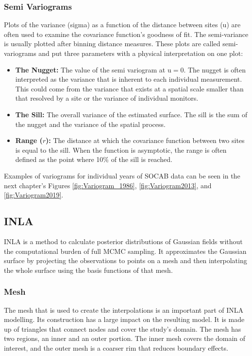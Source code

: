 \subsubsection*{Semi Variograms}
\label{subsubsec:semivariograms}
Plots of the variance (\gls{sigma}) as a function of the distance between sites (\gls{u}) are often used to examine the covariance function's goodness of fit. The semi-variance is usually plotted after binning distance measures. These plots are called semi-variograms and put three parameters with a physical interpretation on one plot:

\begin{itemize}
	\item \textbf{The Nugget:} The value of the semi variogram at \gls{u}$=0$.  The nugget is often interpreted as the variance that is inherent to each individual measurement.  This could come from the variance that exists at a spatial scale smaller than that resolved by a site or the variance of individual monitors.
	\item  \textbf{The Sill:} The overall variance of the estimated surface.  The sill is the sum of the nugget and the variance of the spatial process.
	\item \textbf{Range ($r$):} The distance at which the covariance function between two sites is equal to the sill.  When the function is asymptotic, the range is often defined as the point where 10\% of the sill is reached.  
\end{itemize}

Examples of variograms for individual years of \ac{SOCAB} data can be seen in the next chapter's Figures \ref{fig:Variogram_1986}, \ref{fig:Variogram2013}, and \ref{fig:Variogram2019}.


\subsection{INLA}
\label{subsec:inla}
\ac{INLA} is a method to calculate posterior distributions of Gaussian fields without the computational burden of full \ac{MCMC} sampling. It approximates the Gaussian surface by projecting the observations to points on a mesh and then interpolating the whole surface using the basis functions of that mesh.

\subsubsection*{Mesh} \label{subsec:IntroMesh}
The mesh that is used to create the interpolations is an important part of \ac{INLA} modelling.  Its construction has a large impact on the resulting model.  It is made up of triangles that connect nodes and cover the study's domain.
The mesh has two regions, an inner and an outer portion.  The inner mesh covers the domain of interest, and the outer mesh is a coarser rim that reduces boundary effects.  

